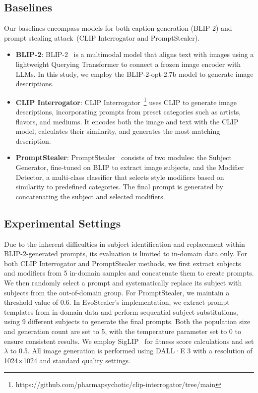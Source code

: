 \subsection{Baselines}
Our baselines encompass models for both caption generation (BLIP-2) and prompt stealing attack~(CLIP Interrogator and PromptStealer).
\begin{itemize}
    \item \textbf{BLIP-2}: BLIP-2~\citep{li2023blip} is a multimodal model that aligns text with images using a lightweight Querying Transformer to connect a frozen image encoder with LLMs. In this study, we employ the BLIP-2-opt-2.7b model to generate image descriptions.
    \item \textbf{CLIP Interrogator}: CLIP Interrogator~\footnote{https://github.com/pharmapsychotic/clip-interrogator/tree/main} uses CLIP to generate image descriptions, incorporating prompts from preset categories such as artists, flavors, and mediums. It encodes both the image and text with the CLIP model, calculates their similarity, and generates the most matching description.
    \item \textbf{PromptStealer}: PromptStealer~\citep{shen2024prompt} consists of two modules: the Subject Generator, fine-tuned on BLIP to extract image subjects, and the Modifier Detector, a multi-class classifier that selects style modifiers based on similarity to predefined categories. The final prompt is generated by concatenating the subject and selected modifiers.
\end{itemize}


\subsection{Experimental Settings}

Due to the inherent difficulties in subject identification and replacement within BLIP-2-generated prompts, its evaluation is limited to in-domain data only. For both CLIP Interrogator and PromptStealer methods, we first extract subjects and modifiers from 5 in-domain samples and concatenate them to create prompts. We then randomly select a prompt and systematically replace its subject with subjects from the out-of-domain group. For PromptStealer, we maintain a threshold value of 0.6. In EvoStealer's implementation, we extract prompt templates from in-domain data and perform sequential subject substitutions, using 9 different subjects to generate the final prompts. Both the population size and generation count are set to 5, with the temperature parameter set to 0 to ensure consistent results. We employ SigLIP~\citep{zhai2023sigmoid} for fitness score calculations and set \(\lambda\) to 0.5. All image generation is performed using DALL·E 3 with a resolution of 1024×1024 and standard quality settings.

